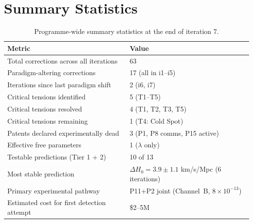 \documentclass[11pt]{article}
\newcommand{\ee}[1]{\times 10^{#1}}
\begin{document}
\section{Summary Statistics}
\label{sec:stats}

\begin{table}[H]
\centering
\caption{Programme-wide summary statistics at the end of iteration 7.}
\label{tab:summary}
\begin{tabular}{p{7cm}l}
\toprule
\textbf{Metric} & \textbf{Value} \\
\midrule
Total corrections across all iterations & 63 \\
Paradigm-altering corrections & 17 (all in i1--i5) \\
Iterations since last paradigm shift & 2 (i6, i7) \\
Critical tensions identified & 5 (T1--T5) \\
Critical tensions resolved & 4 (T1, T2, T3, T5) \\
Critical tensions remaining & 1 (T4: Cold Spot) \\
Patents declared experimentally dead & 3 (P1, P8 comms, P15 active) \\
Effective free parameters & 1 ($\lambda$ only) \\
Testable predictions (Tier 1 + 2) & 10 of 13 \\
Most stable prediction & $\Delta H_0 = 3.9 \pm 1.1$ km/s/Mpc (6 iterations) \\
Primary experimental pathway & P11+P2 joint (Channel~B, $8\ee{-13}$) \\
Estimated cost for first detection attempt & \$2--5M \\
\bottomrule
\end{tabular}
\end{table}
\end{document}
